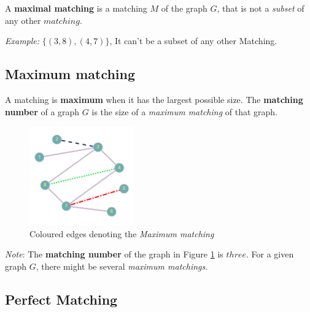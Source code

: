 A \textbf{maximal matching} is a matching $M$ of the graph $G$, that is not a \textit{subset} of any other $matching$.
       
\textit{Example:} $\{(3, 8),(4, 7)\}$, It can't be a subset of any other Matching.
 

\subsection{Maximum matching}

A matching is \textbf{maximum} when it has the largest possible size. The \textbf{matching number} of a graph $G$ is the size of a \textit{maximum matching} of that graph.

    \begin{figure}[ht]
    \begin{center}
  \includegraphics[width=0.4\textwidth]{IMAGES_FIGS/FIG_1_3.png}
  \caption{Coloured edges denoting the \textit{Maximum matching}}
  \label{FIG_1_3}
  \end{center}
  
\end{figure}


\textit{Note}: The \textbf{matching number} of the graph in Figure \ref{FIG_1_3} is $three$.
\newline
For a given graph $G$, there might be several \textit{maximum matchings}.
 

\subsection{Perfect Matching}

